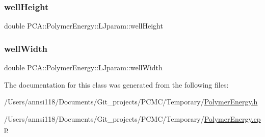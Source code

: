 \hypertarget{class_p_c_a_1_1_polymer_energy_1_1_l_jparam_a0c5a05f9a2c3950df60bfc8554e5421d}{}\label{class_p_c_a_1_1_polymer_energy_1_1_l_jparam_a0c5a05f9a2c3950df60bfc8554e5421d} 
\subsubsection{\texorpdfstring{well\+Height}{wellHeight}}
{\footnotesize\ttfamily double P\+C\+A\+::\+Polymer\+Energy\+::\+L\+Jparam\+::well\+Height}

\hypertarget{class_p_c_a_1_1_polymer_energy_1_1_l_jparam_aa61682f506c151fc3171b8c10dd1e471}{}\label{class_p_c_a_1_1_polymer_energy_1_1_l_jparam_aa61682f506c151fc3171b8c10dd1e471} 
\subsubsection{\texorpdfstring{well\+Width}{wellWidth}}
{\footnotesize\ttfamily double P\+C\+A\+::\+Polymer\+Energy\+::\+L\+Jparam\+::well\+Width}



The documentation for this class was generated from the following files\+:\begin{DoxyCompactItemize}
\item 
/\+Users/annsi118/\+Documents/\+Git\+\_\+projects/\+P\+C\+M\+C/\+Temporary/\hyperlink{_polymer_energy_8h}{Polymer\+Energy.\+h}\item 
/\+Users/annsi118/\+Documents/\+Git\+\_\+projects/\+P\+C\+M\+C/\+Temporary/\hyperlink{_polymer_energy_8cpp}{Polymer\+Energy.\+cpp}\end{DoxyCompactItemize}
